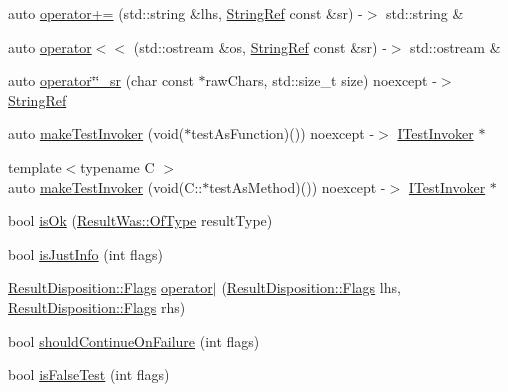 \begin{DoxyCompactItemize}
\item 
auto \mbox{\hyperlink{namespace_catch_a61711bc909f8dc76d8b3deccc1440f46}{operator+=}} (std\+::string \&lhs, \mbox{\hyperlink{class_catch_1_1_string_ref}{String\+Ref}} const \&sr) -\/$>$ std\+::string \&
\item 
auto \mbox{\hyperlink{namespace_catch_a5e37b333d756a28e12d44977f063af43}{operator$<$$<$}} (std\+::ostream \&os, \mbox{\hyperlink{class_catch_1_1_string_ref}{String\+Ref}} const \&sr) -\/$>$ std\+::ostream \&
\item 
auto \mbox{\hyperlink{namespace_catch_a56dcfbb436fa40d778e784bf862e78a6}{operator\char`\"{}\char`\"{}\+\_\+sr}} (char const $\ast$raw\+Chars, std\+::size\+\_\+t size) noexcept -\/$>$ \mbox{\hyperlink{class_catch_1_1_string_ref}{String\+Ref}}
\item 
auto \mbox{\hyperlink{namespace_catch_ab3d8ccbc900fe50322c39ecbba52f536}{make\+Test\+Invoker}} (void($\ast$test\+As\+Function)()) noexcept -\/$>$ \mbox{\hyperlink{struct_catch_1_1_i_test_invoker}{I\+Test\+Invoker}} $\ast$
\item 
{\footnotesize template$<$typename C $>$ }\\auto \mbox{\hyperlink{namespace_catch_a82a954c4d70afa716115820dc7dc8d24}{make\+Test\+Invoker}} (void(C\+::$\ast$test\+As\+Method)()) noexcept -\/$>$ \mbox{\hyperlink{struct_catch_1_1_i_test_invoker}{I\+Test\+Invoker}} $\ast$
\item 
bool \mbox{\hyperlink{namespace_catch_a5205869c81c06d3460759cb86676ae68}{is\+Ok}} (\mbox{\hyperlink{struct_catch_1_1_result_was_a624e1ee3661fcf6094ceef1f654601ef}{Result\+Was\+::\+Of\+Type}} result\+Type)
\item 
bool \mbox{\hyperlink{namespace_catch_a54b01af61673a3e1f21f31713639b180}{is\+Just\+Info}} (int flags)
\item 
\mbox{\hyperlink{struct_catch_1_1_result_disposition_a3396cad6e2259af326b3aae93e23e9d8}{Result\+Disposition\+::\+Flags}} \mbox{\hyperlink{namespace_catch_ab32a083e442cc09f736327d2e2865999}{operator$\vert$}} (\mbox{\hyperlink{struct_catch_1_1_result_disposition_a3396cad6e2259af326b3aae93e23e9d8}{Result\+Disposition\+::\+Flags}} lhs, \mbox{\hyperlink{struct_catch_1_1_result_disposition_a3396cad6e2259af326b3aae93e23e9d8}{Result\+Disposition\+::\+Flags}} rhs)
\item 
bool \mbox{\hyperlink{namespace_catch_a7f7480b15d74965459c844f0d393ed87}{should\+Continue\+On\+Failure}} (int flags)
\item 
bool \mbox{\hyperlink{namespace_catch_a93ef4e3e307a2021ca0d41b32c0e54b0}{is\+False\+Test}} (int flags)

\end{DoxyCompactItemize}
